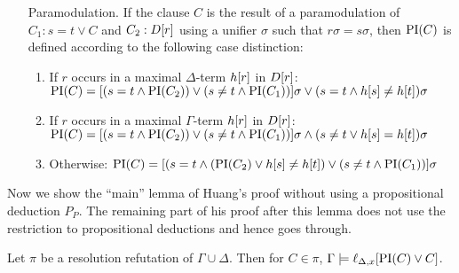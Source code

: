 \documentclass[,%
	paper=a4,%
	DIV14, 
	liststotoc,
	bibtotoc,
	draft=false,%
	numbers=noendperiod
]{scrartcl}
\newcommand{\lif}[1]{\lift{\Delta}{#1}{x}}
\begin{document}
\begin{defi}
\begin{itemize}
    \item[Paramodulation.]
  \label{def:PI_paramod}
      If the clause $C$ is the result of a paramodulation of $C_1: s=t \lor C$ and $C_2: D[r]$ using a unifier $\sigma$ such that $r\sigma = s\sigma$, then $\operatorname{PI}(C)$ is defined according to the following  case distinction:
      \begin{enumerate}
				\item If $r$ occurs in a maximal $\Delta$-term $h[r]$ in $D[r]$: 
          \label{def:PI_paramod_1}
          \newline
          $\operatorname{PI}(C) = [ ( s=t \land \operatorname{PI}(C_2) ) \lor (s\neq t \land \operatorname{PI}(C_1)) ]\sigma \lor (s=t \land h[s] \neq h[t])\sigma$
        \item If $r$ occurs in a maximal $\Gamma$-term $h[r]$ in $D[r]$: 
          \label{def:PI_paramod_2}
          \newline
          $\operatorname{PI}(C) = [ ( s=t \land \operatorname{PI}(C_2) ) \lor (s\neq t \land \operatorname{PI}(C_1)) ]\sigma \land (s\neq t \lor h[s] = h[t])\sigma$
        \item Otherwise:
          \label{def:PI_paramod_3}
          \newline
          $\operatorname{PI}(C) = [ ( s=t \land (\operatorname{PI}(C_2) \lor h[s] \neq h[t] ) \lor (s\neq t \land \operatorname{PI}(C_1)) ]\sigma$ \qedhere

      \end{enumerate}
  \end{itemize}
\end{defi}


Now we show the ``main'' lemma of Huang's proof without using a propositional deduction $P_P$.
The remaining part of his proof after this lemma does not use the restriction to propositional deductions and hence goes through.

\begin{lemma}
	Let $\pi$ be a resolution refutation of $\Gamma \cup \Delta$.
	Then for $C \in \pi$,
	$ \Gamma \entails \lif{\PI(C) \lor C} $.
	\label{lemma:gamma_entails_interpolant}
\end{lemma}
\end{document}
